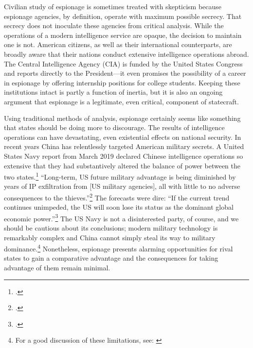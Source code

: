 \documentclass[12pt]{extarticle}
\begin{document}
Civilian study of espionage is sometimes treated with skepticism because espionage agencies, by definition, operate with maximum possible secrecy. That secrecy does not inoculate these agencies from critical analysis. While the operations of a modern intelligence service are opaque, the decision to maintain one is not. American citizens, as well as their international counterparts, are broadly aware that their nations conduct extensive intelligence operations abroad. The Central Intelligence Agency (CIA) is funded by the United States Congress and reports directly to the President---it even promises the possibility of a career in espionage by offering internship positions for college students. Keeping these institutions intact is partly a function of inertia, but it is also an ongoing argument that espionage is a legitimate, even critical, component of statecraft.

Using traditional methods of analysis, espionage certainly seems like something that states should be doing more to discourage. The results of intelligence operations can have devastating, even existential effects on national security. In recent years China has relentlessly targeted American military secrets. A United States Navy report from March 2019 declared Chinese intelligence operations so extensive that they had substantively altered the balance of power between the two states.\footcite{lubold_navy_2019} \enquote{Long-term, US future military advantage is being diminished by years of IP exfiltration from [US military agencies], all with little to no adverse consequences to the thieves.}\footcite[6]{bayer_cybersecurity_2019} The forecasts were dire: \enquote{If the current trend continues unimpeded, the US will soon lose its status as the dominant global economic power.}\footcite[5]{bayer_cybersecurity_2019} The US Navy is not a disinterested party, of course, and we should be cautious about its conclusions; modern military technology is remarkably complex and China cannot simply steal its way to military dominance.\footnote{For a good discussion of these limitations, see: \cite{gilli_why_2019}} Nonetheless, espionage presents alarming opportunities for rival states to gain a comparative advantage and the consequences for taking advantage of them remain minimal.

\end{document}
